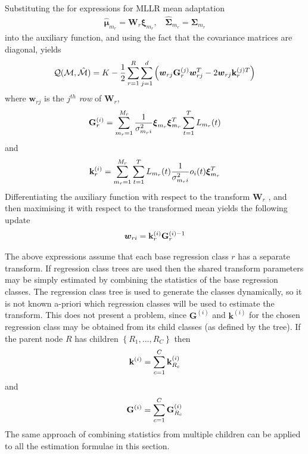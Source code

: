 Substituting the for expressions for MLLR mean adaptation 
\begin{eqnarray}
\hat{\bm{\mu}}_{m_r} = \bm{W}_r\bm{\xi}_{m_r}, \:\:\:\: 
\hat{\bm{\Sigma}}_{m_r} = {\bm{\Sigma}}_{m_r}
\end{eqnarray}
into the auxiliary function, and using the fact that the covariance
matrices are diagonal, yields
\begin{eqnarray}
{\cal Q}({\cal M},{\hat{\cal M}}) = K
- \frac{1}{2}
\sum_{r=1}^R
\sum_{j=1}^d{
\left({\bm{w}}_{rj}{\bf G}^{(j)}_r{\bm{w}}^T_{rj} -2 {\bm{w}}_{rj}{\bf k}^{(j)T}_r
\right)} \nonumber
\end{eqnarray}
where ${\bm{w}}_{rj}$ is the $j^{th}$ {\em row} of $\bm{W}_r$,
\begin{eqnarray}
{\bf G}^{(i)}_r=\sum_{m_r=1}^{M_r}
\frac{1}{\sigma_{m_ri}^{2}}{\bm\xi}_{m_r}{\bm\xi}^{T}_{m_r}
\sum_{t=1}^T\like
\label{eq:gi_mllr}
\end{eqnarray}
and
\begin{eqnarray}
{\bf k}^{(i)}_{r} =  \sum_{m_r=1}^{M_r}\sum\limits_{t=1}^T
\like\frac{1}{\sigma^{2}_{m_ri}} 
o_i(t){\bm\xi}^{T}_{m_r}
\end{eqnarray}
Differentiating the auxiliary function with respect to the transform
${\bm W}_r$ , and then maximising it with respect to the transformed mean
yields the following update
\begin{eqnarray}
{{\bm{w}}}_{ri} = {\bf k}_r^{(i)}{\bf G}_r^{(i)-1} \label{eq:mllrmeansol}
\end{eqnarray}

The above expressions assume that each base regression class $r$ has a
separate transform. If regression class trees are used then the shared
transform parameters may be simply estimated by combining the
statistics of the base regression classes.  The regression class tree
is used to generate the classes dynamically, so it is not known
a-priori which regression classes will be used to estimate the
transform. This does not present a problem, since $\bm{G}^{(i)}$ and
$\bm{k}^{(i)}$ for the chosen regression class may be obtained from its
child classes (as defined by the tree). If the parent node $R$ has
children $\left\{R_1,\dots,R_C\right\}$ then
\[
        {\bf k}^{(i)} = \sum_{c=1}^{C} {\bf k}^{(i)}_{R_c}
\]
and
\[
        {\bf G}^{(i)} = \sum_{c=1}^{C} {\bf G}^{(i)}_{R_c}
\]
The same approach of combining statistics from multiple children can
be applied to all the estimation formulae in this section.

